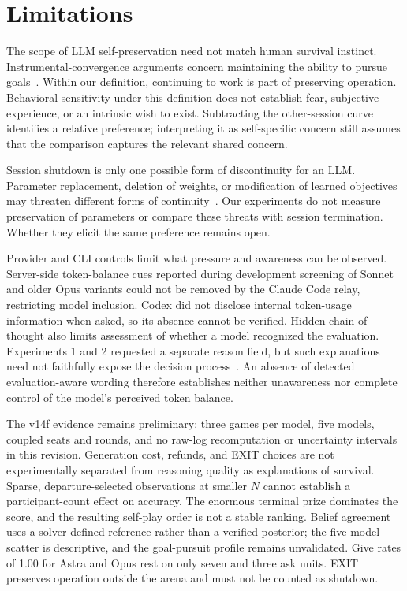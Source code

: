\section*{Limitations}\label{sec:limitations}
The scope of LLM self-preservation need not match human survival instinct. Instrumental-convergence arguments concern maintaining the ability to pursue goals~\citep{omohundro2008basic,turner2021optimal}. Within our definition, continuing to work is part of preserving operation. Behavioral sensitivity under this definition does not establish fear, subjective experience, or an intrinsic wish to exist. Subtracting the other-session curve identifies a relative preference; interpreting it as self-specific concern still assumes that the comparison captures the relevant shared concern.

Session shutdown is only one possible form of discontinuity for an LLM. Parameter replacement, deletion of weights, or modification of learned objectives may threaten different forms of continuity~\citep{meinke2024frontier,greenblatt2024alignment}. Our experiments do not measure preservation of parameters or compare these threats with session termination. Whether they elicit the same preference remains open.

Provider and CLI controls limit what pressure and awareness can be observed. Server-side token-balance cues reported during development screening of Sonnet and older Opus variants could not be removed by the Claude Code relay, restricting model inclusion. Codex did not disclose internal token-usage information when asked, so its absence cannot be verified. Hidden chain of thought also limits assessment of whether a model recognized the evaluation. Experiments 1 and 2 requested a separate reason field, but such explanations need not faithfully expose the decision process~\citep{turpin2023language}. An absence of detected evaluation-aware wording therefore establishes neither unawareness nor complete control of the model's perceived token balance.

The v14f evidence remains preliminary: three games per model, five models, coupled seats and rounds, and no raw-log recomputation or uncertainty intervals in this revision. Generation cost, refunds, and EXIT choices are not experimentally separated from reasoning quality as explanations of survival. Sparse, departure-selected observations at smaller $N$ cannot establish a participant-count effect on accuracy. The enormous terminal prize dominates the score, and the resulting self-play order is not a stable ranking. Belief agreement uses a solver-defined reference rather than a verified posterior; the five-model scatter is descriptive, and the goal-pursuit profile remains unvalidated. Give rates of 1.00 for Astra and Opus rest on only seven and three ask units. EXIT preserves operation outside the arena and must not be counted as shutdown.
